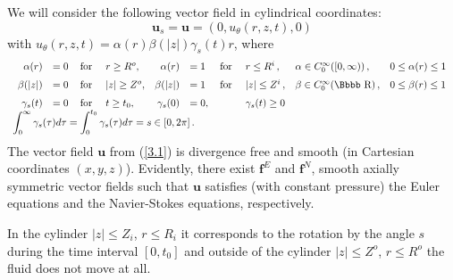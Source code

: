 \documentclass[12pt,twoside]{article}
\def \al{\alpha}  \def \be{\beta}    \def \ga{\gamma}
\newcommand {\rdd}{\mbox{\Bbbb R}}
\newcommand {\bu}{{\mathbf{u}}}
\newcommand {\bff}{{\mathbf{f}}}
\begin{document}
\setcounter{equation}{0}
We will consider the following vector field in cylindrical coordinates:
\begin{equation}  \label{3.1}
\bu_s = \bu = (0, u_\theta(r,z,t), 0)
\end{equation}
with $u_\theta(r,z,t) = \al(r) \be(|z|) \ga_s(t) r$, where
$$
\begin{array}{l}
\begin{array}{rlllrlllll}
\al(r) &= 0 &\, {\rm for \ } & r\geq R^o, & \al(r) &= 1 &  \, {\rm for \ }
& r \leq R^i \, , & \al \in C^\infty_0([0,\infty)) \, , & 0\leq \al(r) \leq 1 \\[6pt]
\be(|z|) &= 0 &\, {\rm for \ } & |z|\geq Z^o, & \be(|z|) &= 1 &  \, {\rm for \ }
& |z| \leq Z^i \, , & \be \in C^\infty_0(\rdd) \, , & 0\leq \be(r) \leq 1 \\[6pt]
\ga_s(t) &= 0 &\, {\rm for \ } & t\geq t_0, & \ga_s(0) &= 0, & &  \ga_s(t)
 \geq 0  
\end{array}
\\[6pt]
\displaystyle \int_0^\infty \ga_s(\tau) d \tau = \int_0^{t_0} \ga_s(\tau) d \tau = s \in
[0,2\pi]\, .
\end{array}
$$
The vector field $\bu$ from (\ref{3.1}) is divergence free and
smooth (in Cartesian coordinates $(x,y,z)$). Evidently, there exist $\bff^E$ 
and $\bff^N$, smooth axially symmetric vector fields such that $\bu$ satisfies
(with constant pressure) the Euler equations and the Navier-Stokes equations,
respectively. 

In the cylinder $|z|\leq Z_i$, $r\leq R_i$
it corresponds to the rotation by the angle $s$ during the time interval $[0,t_0]$
and outside of the cylinder $|z|\leq Z^o$, $r\leq R^o$ the fluid does not
move at all.
\end{document}
